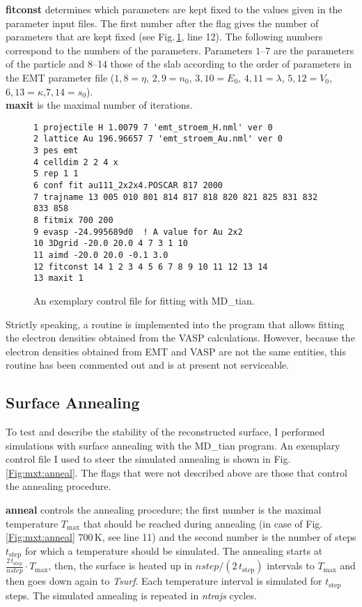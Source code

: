 \documentclass[twoside, 11pt, titlepage, captions=nooneline, a4paper, headsepline]{scrbook}%
\begin{document}
\textbf{fitconst} determines which parameters are kept fixed to the values given in the parameter input files. The first number after the flag gives the number of parameters that are kept fixed (see Fig.\,\ref{Fig:mxt:fitting}, line 12). The following numbers correspond to the numbers of the parameters. Parameters $1$--$7$ are the parameters of the particle and 8--14 those of the slab according to the order of parameters in the EMT parameter file ($1,8 = \eta$, $2,9 = n_0$, $3,10 = E_0$, $4,11 = \lambda$, $5,12 = V_0$, $6,13 = \kappa$,$7,14 = s_0$).\\
\textbf{maxit} is the maximal number of iterations.
\begin{figure}[t!]
\begin{verbatim}
1 projectile H 1.0079 7 'emt_stroem_H.nml' ver 0
2 lattice Au 196.96657 7 'emt_stroem_Au.nml' ver 0
3 pes emt
4 celldim 2 2 4 x
5 rep 1 1
6 conf fit au111_2x2x4.POSCAR 817 2000
7 trajname 13 005 010 801 814 817 818 820 821 825 831 832 833 858
8 fitmix 700 200
9 evasp -24.995689d0  ! A value for Au 2x2
10 3Dgrid -20.0 20.0 4 7 3 1 10
11 aimd -20.0 20.0 -0.1 3.0
12 fitconst 14 1 2 3 4 5 6 7 8 9 10 11 12 13 14
13 maxit 1 
\end{verbatim}
\caption{\label{Fig:mxt:fitting}An exemplary control file for fitting with MD\_tian.}
\end{figure}

Strictly speaking, a routine is implemented into the program that allows fitting the electron densities obtained from the VASP calculations. However, because the electron densities obtained from EMT and VASP are not the same entities, this routine has been commented out and is at present not serviceable.

\subsection{Surface Annealing}
To test and describe the stability of the reconstructed surface, I performed simulations with surface annealing with the MD\_tian program. An exemplary control file I used to steer the simulated annealing is shown in Fig.\,\ref{Fig:mxt:anneal}. The flags that were not described above are those that control the annealing procedure.

\textbf{anneal} controls the annealing procedure; the first number is the maximal temperature $T_\mathrm{max}$ that should be reached during annealing (in case of Fig.\,\ref{Fig:mxt:anneal} 700\,K, see line 11) and the second number is the number of steps $t_\mathrm{step}$ for which a temperature should be simulated.
The annealing starts at $\tfrac{2\,t_\mathrm{step}}{nstep} \cdot T_\mathrm{max}$, then, the surface is heated up in $nstep/(2\,t_\mathrm{step})$ intervals to $T_\mathrm{max}$ and then goes down again to \textit{Tsurf}. Each temperature interval is simulated for $t_\mathrm{step}$ steps. The simulated annealing is repeated in \textit{ntrajs} cycles.
\end{document}
